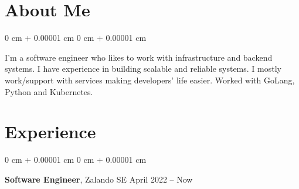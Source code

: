\documentclass[10pt, letterpaper]{article}
\newenvironment{highlights}{
    \begin{itemize}[
        topsep=0.10 cm,
        parsep=0.10 cm,
        partopsep=0pt,
        itemsep=0pt,
        leftmargin=0 cm + 10pt
    ]
}{
    \end{itemize}
} %
\newenvironment{highlightsforbulletentries}{
    \begin{itemize}[
        topsep=0.10 cm,
        parsep=0.10 cm,
        partopsep=0pt,
        itemsep=0pt,
        leftmargin=10pt
    ]
}{
    \end{itemize}
} %
\newenvironment{onecolentry}{
    \begin{adjustwidth}{
        0 cm + 0.00001 cm
    }{
        0 cm + 0.00001 cm
    }
}{
    \end{adjustwidth}
} %
\newenvironment{twocolentry}[2][]{
    \onecolentry
    \def\secondColumn{#2}
    \setcolumnwidth{\fill, 4.5 cm}
    \begin{paracol}{2}
}{
    \switchcolumn \raggedleft \secondColumn
    \end{paracol}
    \endonecolentry
} %
\begin{document}
    \section{About Me}
        \begin{onecolentry}
            I'm a software engineer who likes to work with infrastructure and backend systems. I have experience in building scalable and reliable systems.
            I mostly work/support with services making developers' life easier. Worked with GoLang, Python and Kubernetes.
        \end{onecolentry}
        
    
    \section{Experience}
        \begin{twocolentry}{
            April 2022 – Now
        }
            \textbf{Software Engineer}, Zalando SE\end{twocolentry}
\end{document}
